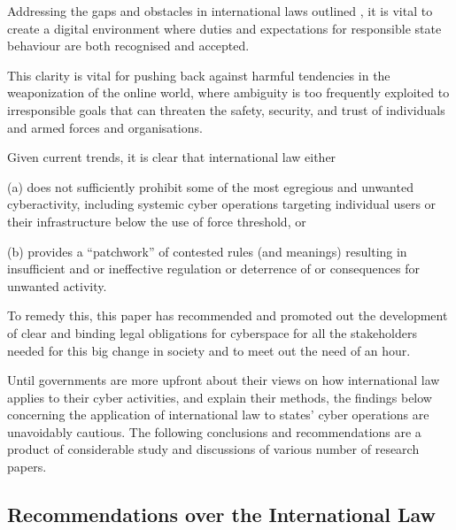 \documentclass{article}
\begin{document}
Addressing the gaps and obstacles in international laws outlined , it is vital to create a digital environment where duties and expectations for responsible state behaviour are both recognised and accepted.

This clarity is vital for pushing back against harmful tendencies in the weaponization of the online world, where ambiguity is too frequently exploited to irresponsible goals that can threaten the safety, security, and trust of individuals and armed forces and organisations.

Given current trends, it is clear that international law either

(a) does not sufficiently prohibit some of the most egregious and unwanted cyberactivity, including systemic cyber operations targeting individual users or their infrastructure below the use of force threshold, or

(b) provides a “patchwork” of contested rules (and meanings) resulting in insufficient and or ineffective regulation or deterrence of or consequences for unwanted activity.

To remedy this, this paper has recommended and promoted out the development of clear and binding legal obligations for cyberspace for all the stakeholders needed for this big change in society and to meet out the need of an hour.

Until governments are more upfront about their views on how international law applies to their cyber activities, and explain their methods, the findings below concerning the application of international law to states’ cyber operations are unavoidably cautious. The following conclusions and recommendations are a product of considerable study and discussions of various number of research papers.

\subsection{Recommendations over the International Law}
\end{document}
